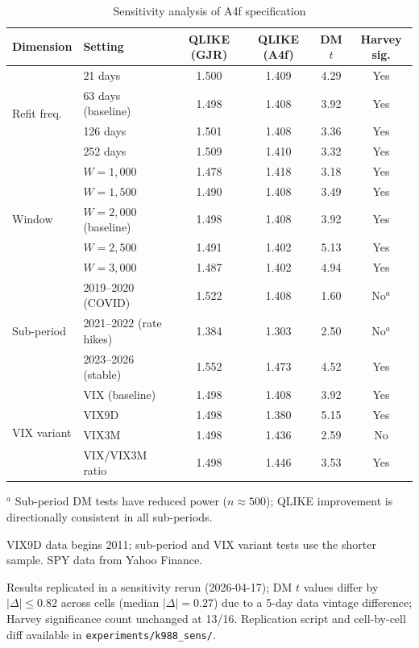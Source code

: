 \documentclass[12pt,a4paper]{article}
\begin{document}
\begin{table}[H]
\centering
\caption{Sensitivity analysis of A4f specification}
\label{tab:sensitivity}
\begin{threeparttable}
\small
\begin{tabular}{@{}llcccc@{}}
\toprule
Dimension & Setting & QLIKE (GJR) & QLIKE (A4f) & DM $t$ & Harvey sig. \\
\midrule
\multirow{4}{*}{Refit freq.} & 21 days & 1.500 & 1.409 & 4.29 & Yes \\
 & 63 days (baseline) & 1.498 & 1.408 & 3.92 & Yes \\
 & 126 days & 1.501 & 1.408 & 3.36 & Yes \\
 & 252 days & 1.509 & 1.410 & 3.32 & Yes \\
\midrule
\multirow{5}{*}{Window} & $W = 1{,}000$ & 1.478 & 1.418 & 3.18 & Yes \\
 & $W = 1{,}500$ & 1.490 & 1.408 & 3.49 & Yes \\
 & $W = 2{,}000$ (baseline) & 1.498 & 1.408 & 3.92 & Yes \\
 & $W = 2{,}500$ & 1.491 & 1.402 & 5.13 & Yes \\
 & $W = 3{,}000$ & 1.487 & 1.402 & 4.94 & Yes \\
\midrule
\multirow{3}{*}{Sub-period} & 2019--2020 (COVID) & 1.522 & 1.408 & 1.60 & No$^a$ \\
 & 2021--2022 (rate hikes) & 1.384 & 1.303 & 2.50 & No$^a$ \\
 & 2023--2026 (stable) & 1.552 & 1.473 & 4.52 & Yes \\
\midrule
\multirow{4}{*}{VIX variant} & VIX (baseline) & 1.498 & 1.408 & 3.92 & Yes \\
 & VIX9D & 1.498 & 1.380 & 5.15 & Yes \\
 & VIX3M & 1.498 & 1.436 & 2.59 & No \\
 & VIX/VIX3M ratio & 1.498 & 1.446 & 3.53 & Yes \\
\bottomrule
\end{tabular}
\begin{tablenotes}
\footnotesize
\item $^a$ Sub-period DM tests have reduced power ($n \approx 500$); QLIKE improvement is directionally consistent in all sub-periods.
\item VIX9D data begins 2011; sub-period and VIX variant tests use the shorter sample. SPY data from Yahoo Finance.
\item Results replicated in a sensitivity rerun (2026-04-17); DM $t$ values differ by $|\Delta| \le 0.82$ across cells (median $|\Delta| = 0.27$) due to a 5-day data vintage difference; Harvey significance count unchanged at 13/16. Replication script and cell-by-cell diff available in \texttt{experiments/k988\_sens/}.
\end{tablenotes}
\end{threeparttable}
\end{table}
\end{document}
